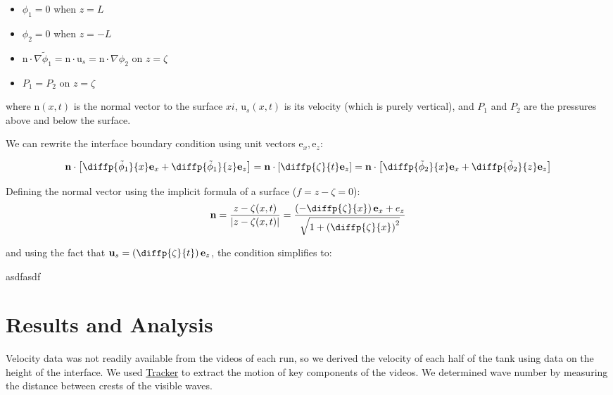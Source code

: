 \documentclass{article}
\renewcommand{\vec}[1]{\bm{\mathrm{#1}}}
\begin{document}
\begin{itemize}
    \item \(\phi_1 = 0\) when \(z = L\)
    \item \(\phi_2 = 0\) when \(z = -L\)
    \item \(\vec n \cdot \nabla \tilde \phi_1 = \vec n \cdot \vec u_s = \vec n \cdot \nabla \phi_2\) on \(z = \zeta\)
    \item \(P_1 = P_2\) on \(z = \zeta\)
\end{itemize}
where \(\vec n(x, t)\) is the normal vector to the surface \(xi\), \(\vec u_s(x,
t)\) is its velocity (which is purely vertical), and \(P_1\) and \(P_2\) are the pressures above and below
the surface.

We can rewrite the interface boundary condition using unit vectors \(\vec e_x, \vec e_z\):

\[ \vec n \cdot \left[ \diffp{\tilde \phi_1}{x} \vec e_x + \diffp{\tilde \phi_1}{z} \vec e_z\right] = \vec n \cdot \left[ \diffp{\zeta}{t} \vec e_z\right] = \vec n \cdot \left[\diffp{\tilde \phi_2}{x} \vec e_x + \diffp{\tilde \phi_2}{z} \vec e_z \right]\]

Defining the normal vector using the implicit formula of a surface (\(f = z - \zeta = 0\)):
\[\vec n = \frac{z - \zeta(x, t)}{|z - \zeta(x, t)|} = \frac{\left(-\diffp{\zeta}{x}\right)\vec e_x + e_z}{\sqrt{1 + \left(\diffp{\zeta}{x}\right)^2}}\]

and using the fact that \(\vec u_s = \left(\diffp{\zeta}{t}\right)\vec e_z\), the condition simplifies to:

asdfasdf

\section{Results and Analysis}

Velocity data was not readily available from the videos of each run, so we
derived the velocity of each half of the tank using data on the height of the
interface. We used \href{https://physlets.org/tracker/}{Tracker} to extract the
motion of key components of the videos. We determined wave number by measuring
the distance between crests of the visible waves.
\end{document}
